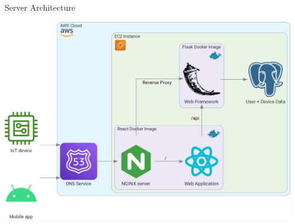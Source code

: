 \documentclass[final]{beamer}
\newlength{\sepwidth}
\newlength{\colwidth}
\newcommand{\separatorcolumn}{\begin{column}{\sepwidth}\end{column}}
\begin{document}
\begin{frame}[t]
\begin{columns}[t]
\begin{column}{\colwidth}
\begin{block}{Server Architecture}
        \vskip 0.5cm
        \begin{center}
          \includegraphics[width = 0.95 \textwidth]{data_flow.png}
        \end{center}
      \end{block}

    \end{column}

    \separatorcolumn

  \end{columns}
\end{frame}
\end{document}
